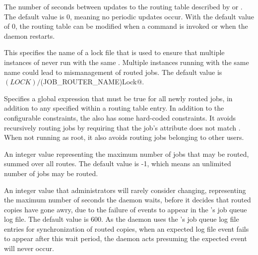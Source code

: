 \begin{description}
\label{param:JobRouterEntriesRefresh}
\item[\Macro{JOB\_ROUTER\_ENTRIES\_REFRESH}]
  The number of seconds between updates to the routing table described by
   or
  .
  The default value is 0, meaning no periodic updates occur.
  With the default value of 0, the routing table can be modified
  when a  command is invoked 
  or when the  daemon restarts.

\label{param:JobRouterLock}
\item[\Macro{JOB\_ROUTER\_LOCK}] This specifies the name of a lock
 file that is used to ensure that multiple instances of
  never run with the same
 .  Multiple instances running with the
 same name could lead to mismanagement of routed jobs.  The default
 value is \verb@$(LOCK)/$(JOB_ROUTER_NAME)Lock@.

\label{param:JobRouterSourceJobConstraint}
\item[\Macro{JOB\_ROUTER\_SOURCE\_JOB\_CONSTRAINT}]
  Specifies a global  expression that must be true
  for all newly routed jobs,
  in addition to any  specified within a routing table entry.
  In addition to the configurable constraints, the
  also has some hard-coded constraints.  It avoids
 recursively routing jobs by requiring that the job's attribute 
 does not match .  When not running as root,
 it also avoids routing jobs belonging to other users.

\label{param:JobRouterMaxJobs}
\item[\Macro{JOB\_ROUTER\_MAX\_JOBS}]
  An integer value representing the maximum number of jobs that may be routed,
  summed over all routes.
  The default value is -1, which means an unlimited number of jobs
  may be routed.

\label{param:MaxJobMirrorUpdateLag}
\item[\Macro{MAX\_JOB\_MIRROR\_UPDATE\_LAG}]
  An integer value that administrators will rarely consider changing,
  representing the maximum number of
  seconds the  daemon waits,
  before it decides that routed copies have gone awry,
  due to the failure of events to appear
  in the 's job queue log file.
  The default value is 600.
  As the  daemon uses the 's
  job queue log file entries for synchronization of routed copies,
  when an expected log file event fails to appear after this wait period,
  the  daemon acts presuming the expected event
  will never occur.


\end{description}

